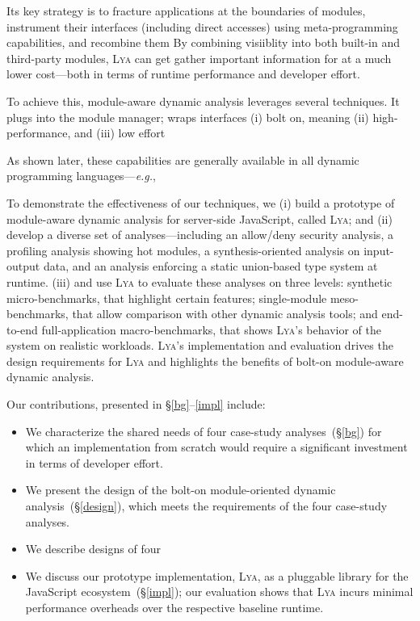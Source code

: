 \documentclass[letterpaper,twocolumn,10pt]{article}
\def\eg{{\em e.g.}, }
\newcommand{\sx}[1]{(\S\ref{#1})}
\newcommand{\sys}{{\scshape Lya}\xspace}
\begin{document}
Its key strategy is to fracture applications at the boundaries of modules, instrument their interfaces (including direct accesses) using meta-programming capabilities, and recombine them 
By combining visiiblity into both built-in and third-party modules, \sys can get gather important information for 
at a much lower cost---both in terms of runtime performance and developer effort.

To achieve this, module-aware dynamic analysis leverages several techniques.
It plugs into the module manager;
wraps interfaces
(i) bolt on, meaning
(ii) high-performance, and 
(iii) low effort 

As shown later, these capabilities are generally available in all dynamic programming languages---\eg 

To demonstrate the effectiveness of our techniques, we
  (i) build a prototype of module-aware dynamic analysis for server-side JavaScript, called \sys; and
  (ii) develop a diverse set of analyses---including an allow/deny security analysis, a profiling analysis showing hot modules, a synthesis-oriented analysis on input-output data, and an analysis enforcing a static union-based type system at runtime.
  (iii)  and use \sys to evaluate these analyses on three levels:
    synthetic micro-benchmarks, that highlight certain features;
    single-module meso-benchmarks, that allow comparison with other dynamic analysis tools; and
    end-to-end full-application macro-benchmarks, that shows \sys's behavior of the system on realistic workloads. 
\sys's implementation and evaluation drives the design requirements for \sys and highlights the benefits of bolt-on module-aware dynamic analysis.

Our contributions, presented in \S\ref{bg}--\ref{impl} include:
\begin{itemize}
\item We characterize the shared needs of four case-study analyses~\sx{bg} for which an implementation from scratch would require a significant investment in terms of developer effort.
\item We present the design of the bolt-on module-oriented dynamic analysis~\sx{design}, which meets the requirements of the four case-study analyses.
\item We describe designs of four 
\item We discuss our prototype implementation, \sys, as a pluggable library for the JavaScript ecosystem~\sx{impl}; our evaluation shows that \sys incurs minimal performance overheads over the respective baseline runtime.
\end{itemize}
\end{document}
